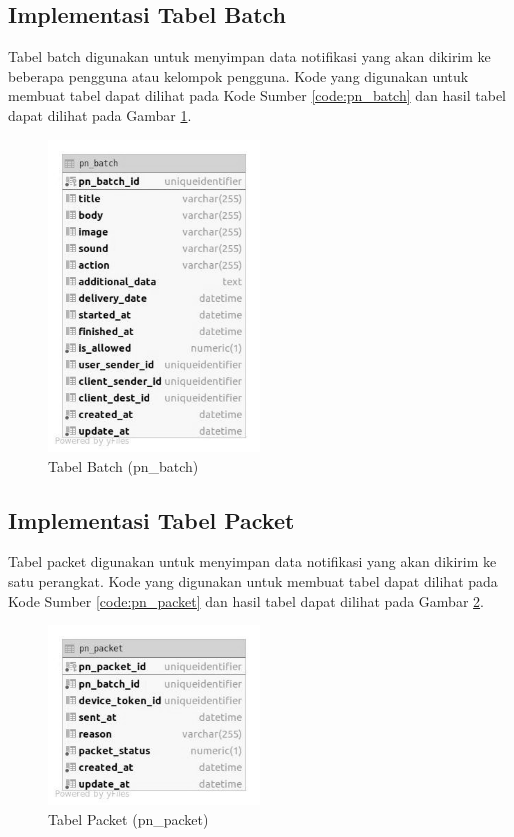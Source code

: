 \subsection{Implementasi Tabel Batch}
\par Tabel batch digunakan untuk menyimpan data notifikasi yang akan dikirim ke beberapa pengguna atau kelompok pengguna. Kode yang digunakan untuk membuat tabel dapat dilihat pada Kode Sumber \ref{code:pn_batch} dan hasil tabel dapat dilihat pada Gambar \ref{tabel_pn_batch}.

\begin{figure}[H]
    \centering\includegraphics[width=0.5\textwidth]{bab4/figures/tabel_pn_batch.jpg}
    \caption{Tabel Batch (pn\_batch)}
    \label{tabel_pn_batch}
\end{figure}

\subsection{Implementasi Tabel Packet}
\par Tabel packet digunakan untuk menyimpan data notifikasi yang akan dikirim ke satu perangkat. Kode yang digunakan untuk membuat tabel dapat dilihat pada Kode Sumber \ref{code:pn_packet} dan hasil tabel dapat dilihat pada Gambar \ref{tabel_pn_packet}.
\clearpage

\begin{figure}[H]
    \centering\includegraphics[width=0.5\textwidth]{bab4/figures/tabel_pn_packet.jpg}
    \caption{Tabel Packet (pn\_packet)}
    \label{tabel_pn_packet}
\end{figure}
\clearpage

